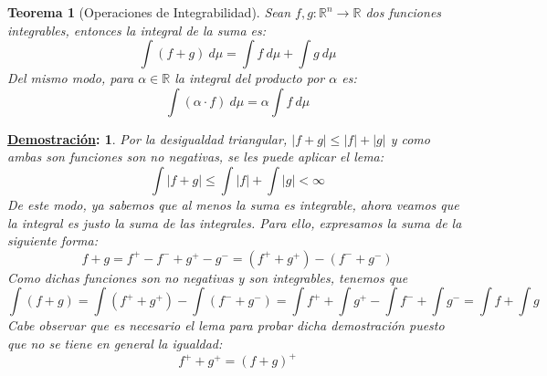 \documentclass[10pt,a4paper,openright]{book}
\theoremstyle{break}
\newtheorem*{theo}{Teorema}
\newtheorem*{demo}{\underline{Demostración}:}
\newcommand{\dif}[1]{\ d#1}
\begin{document}
\begin{theo}[Operaciones de Integrabilidad]
Sean $f,g: \mathbb{R}^n \rightarrow \mathbb{R}$ dos funciones integrables, entonces la integral de la suma es:
$$\int (f+g) \dif{\mu} = \int f \dif{\mu} + \int g \dif{\mu}$$
Del mismo modo, para $\alpha \in \mathbb{R}$ la integral del producto por $\alpha$ es:
$$\int (\alpha \cdot f) \dif{\mu} = \alpha \int f \dif{\mu}$$
\end{theo}
\begin{demo}
Por la desigualdad triangular, $|f+g|\leq |f| + |g|$ y como ambas son funciones son no negativas, se les puede aplicar el lema:
$$\int |f+g| \leq \int |f| + \int |g| < \infty $$
De este modo, ya sabemos que al menos la suma es integrable, ahora veamos que la integral es justo la suma de las integrales. Para ello, expresamos la suma de la siguiente forma:
$$f+ g = f^+ - f^- + g^+ - g^- = (f^+ + g^+) - (f^- + g^-)$$
Como dichas funciones son  no negativas y son integrables, tenemos que
$$\int (f+g) = \int (f^+ + g^+) - \int (f^- + g^- ) = \int f^+ + \int g^+ - \int f^- +\int g^-  = \int f + \int g$$
Cabe observar que es necesario el lema para probar dicha demostración puesto que no se tiene en general la igualdad:
$$f^+ + g^+ = (f+g)^+$$
\end{demo}
\end{document}
